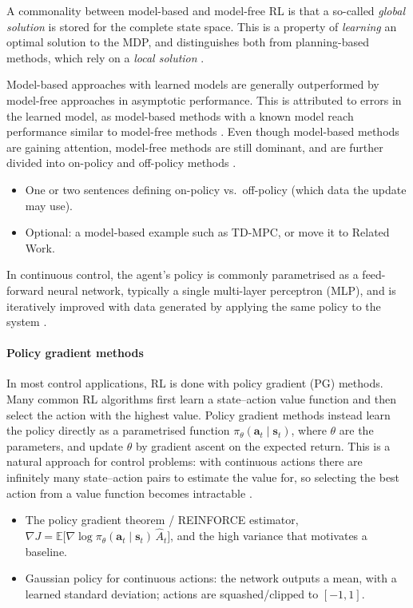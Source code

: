 A commonality between model-based and model-free RL is that a so-called \textit{global solution} is stored for the complete state space. This is a property of \textit{learning} an optimal solution to the MDP, and distinguishes both from planning-based methods, which rely on a \textit{local solution} \parencite{moerland2023mbrl}.

Model-based approaches with learned models are generally outperformed by model-free approaches in asymptotic performance. This is attributed to errors in the learned model, as model-based methods with a known model reach performance similar to model-free methods \parencite{moerland2023mbrl}. Even though model-based methods are gaining attention, model-free methods are still dominant, and are further divided into on-policy and off-policy methods \parencite{sutton2018reinforcement}.

\begin{itemize}
  \item One or two sentences defining on-policy vs.\ off-policy (which data the update may use).
  \item Optional: a model-based example such as TD-MPC, or move it to Related Work.
\end{itemize}

In continuous control, the agent's policy is commonly parametrised as a feed-forward neural network, typically a single multi-layer perceptron (MLP), and is iteratively improved with data generated by applying the same policy to the system \parencite{moerland2023mbrl}.

\paragraph{Policy gradient methods}
In most control applications, RL is done with policy gradient (PG) methods. Many common RL algorithms first learn a state--action value function and then select the action with the highest value. Policy gradient methods instead learn the policy directly as a parametrised function $\pi_\theta(\mathbf{a}_t \mid \mathbf{s}_t)$, where $\theta$ are the parameters, and update $\theta$ by gradient ascent on the expected return. This is a natural approach for control problems: with continuous actions there are infinitely many state--action pairs to estimate the value for, so selecting the best action from a value function becomes intractable \parencite{weng2018bandit}.

\begin{itemize}
  \item The policy gradient theorem / REINFORCE estimator,
        $\nabla J = \mathbb{E}\bigl[\nabla \log \pi_\theta(\mathbf{a}_t\mid\mathbf{s}_t)\,\hat A_t\bigr]$,
        and the high variance that motivates a baseline.
  \item Gaussian policy for continuous actions: the network outputs a mean, with a learned
        standard deviation; actions are squashed/clipped to $[-1,1]$.
\end{itemize}

